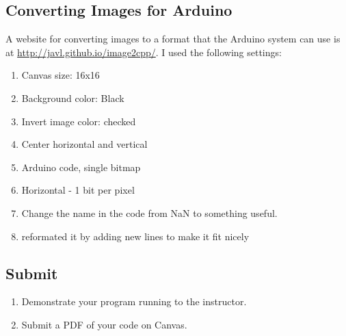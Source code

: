 \subsection{Converting Images for Arduino}
A website for converting images to a format that the Arduino system can use is at 
\href{http://javl.github.io/image2cpp/}{http://javl.github.io/image2cpp/}. I used the following settings:
\begin{enumerate}
	\item Canvas size: 16x16
	\item  Background color: Black
	\item  Invert image color: checked
	\item  Center horizontal and vertical
	\item  Arduino code, single bitmap
	\item  Horizontal - 1 bit per pixel
	\item  Change the name in the code from NaN to something useful.
	\item  reformated it by adding new lines to make it fit nicely
\end{enumerate}

\subsection{Submit}
\begin{enumerate}
	\item Demonstrate your program running to the instructor.
	\item Submit a PDF of your code on Canvas.
\end{enumerate}
